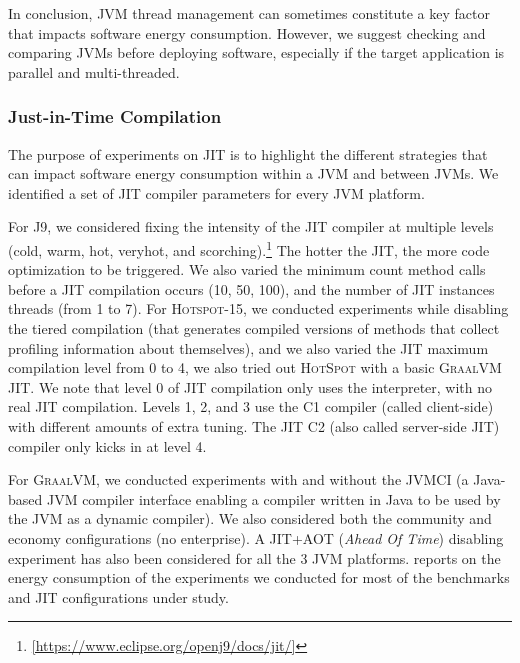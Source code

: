 In conclusion, JVM thread management can sometimes constitute a key factor that impacts software energy consumption.
However, we suggest checking and comparing JVMs before deploying software, especially if the target application is parallel and multi-threaded.


\subsubsection{Just-in-Time Compilation}
The purpose of experiments on JIT is to highlight the different strategies that can impact software energy consumption within a JVM and between JVMs.
We identified a set of JIT compiler parameters for every JVM platform.

For \textsc{J9}, we considered fixing the intensity of the JIT compiler at multiple levels (\textsf{cold}, \textsf{warm}, \textsf{hot}, \textsf{veryhot}, and \textsf{scorching}).\footnote{\url{[https://www.eclipse.org/openj9/docs/jit/]}}
The hotter the JIT, the more code optimization to be triggered.
We also varied the minimum count method calls before a JIT compilation occurs (\textsf{10}, \textsf{50}, \textsf{100}), and the number of JIT instances threads (from \textsf{1} to \textsf{7}).
For \textsc{Hotspot-15}, we conducted experiments while disabling the tiered compilation (that generates compiled versions of methods that collect profiling information about themselves), and we also varied the JIT maximum compilation level from \textsf{0} to \textsf{4}, we also tried out \textsc{HotSpot} with a basic \textsc{GraalVM} JIT.
We note that level 0 of JIT compilation only uses the interpreter, with no real JIT compilation.
Levels 1, 2, and 3 use the C1 compiler (called client-side) with different amounts of extra tuning.
The JIT C2 (also called server-side JIT) compiler only kicks in at level 4.

For \textsc{GraalVM}, we conducted experiments with and without the JVMCI (a Java-based JVM compiler interface enabling a compiler written in Java to be used by the JVM as a dynamic compiler).
We also considered both the community and economy configurations (no enterprise).
A JIT+AOT (\emph{Ahead Of Time}) disabling experiment has also been considered for all the 3 JVM platforms.
 reports on the energy consumption of the experiments we conducted for most of the benchmarks and JIT configurations under study.



